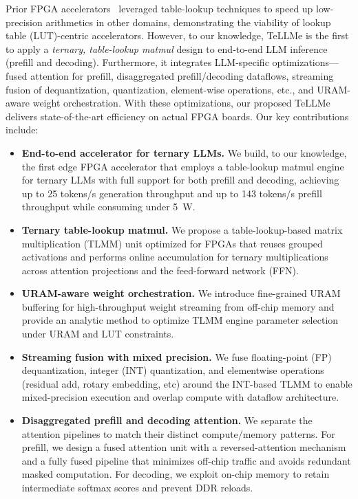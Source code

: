 \documentclass[sigconf]{acmart}
\begin{document}
Prior FPGA accelerators~\cite{LUTNET, SUMLUTNET, TLMAC} leveraged table-lookup techniques to speed up low-precision arithmetics in other domains, demonstrating the viability of lookup table (LUT)-centric accelerators. However, to our knowledge, TeLLMe is the first to apply a \emph{ternary, table-lookup matmul} design to end-to-end LLM inference (prefill and decoding). Furthermore, it integrates LLM-specific optimizations—fused attention for prefill, disaggregated prefill/decoding dataflows, streaming fusion of dequantization, quantization, element-wise operations, etc., and URAM-aware weight orchestration. With these optimizations, our proposed TeLLMe delivers state-of-the-art efficiency on actual FPGA boards.
Our key contributions include:
\begin{itemize}[leftmargin=*, nosep]
\item \textbf{End-to-end accelerator for ternary LLMs.} We build, to our knowledge, the first edge FPGA accelerator that employs a table-lookup matmul engine for ternary LLMs with full support for both prefill and decoding, achieving up to 25 tokens/s generation throughput and up to 143 tokens/s prefill throughput while consuming under 5~W.
\item \textbf{Ternary table-lookup matmul.} We propose a table-lookup-based matrix multiplication (TLMM) unit optimized for FPGAs that reuses grouped activations and performs online accumulation for ternary multiplications across attention projections and the feed-forward network (FFN).
\item \textbf{URAM-aware weight orchestration.} We introduce fine-grained URAM buffering for high-throughput weight streaming from off-chip memory and provide an analytic method to optimize TLMM engine parameter selection under URAM and LUT constraints.
\item \textbf{Streaming fusion with mixed precision.} We fuse floating-point (FP) dequantization, integer (INT) quantization, and elementwise operations (residual add, rotary embedding, etc)  around the INT-based TLMM to enable mixed-precision execution and overlap compute with dataflow architecture.
\item \textbf{Disaggregated prefill and decoding attention.} We separate the attention pipelines to match their distinct compute/memory patterns. For prefill, we design a fused attention unit with a reversed-attention mechanism and a fully fused pipeline that minimizes off-chip traffic and avoids redundant masked computation. For decoding, we exploit on-chip memory to retain intermediate softmax scores and prevent DDR reloads.
\end{itemize}
\end{document}

